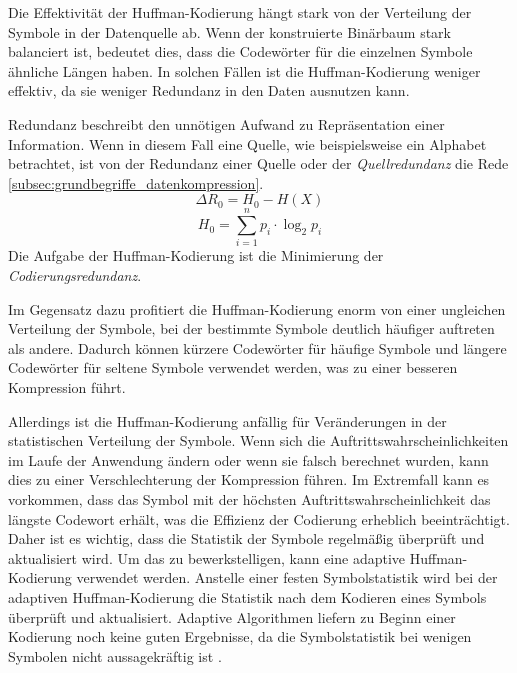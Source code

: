 Die Effektivität der Huffman-Kodierung hängt stark von der Verteilung der Symbole in der Datenquelle ab. 
Wenn der konstruierte Binärbaum stark balanciert ist, bedeutet dies, dass die Codewörter für die einzelnen Symbole ähnliche Längen haben.
In solchen Fällen ist die Huffman-Kodierung weniger effektiv, da sie weniger Redundanz in den Daten ausnutzen kann.

Redundanz beschreibt den unnötigen Aufwand zu Repräsentation einer Information.
Wenn in diesem Fall eine Quelle, wie beispielsweise ein Alphabet betrachtet, ist von der Redundanz einer Quelle oder der \textit{Quellredundanz} die Rede \ref{subsec:grundbegriffe_datenkompression}.
\begin{equation*}
\Delta R_0 = H_0 - H(X)
\end{equation*}
\begin{equation*}
H_0 = \sum_{i=1}^{n} p_i \cdot \log_2{p_i}
\end{equation*}
Die Aufgabe der Huffman-Kodierung ist die Minimierung der \textit{Codierungsredundanz}.

Im Gegensatz dazu profitiert die Huffman-Kodierung enorm von einer ungleichen Verteilung der Symbole, bei der bestimmte Symbole deutlich häufiger auftreten als andere. 
Dadurch können kürzere Codewörter für häufige Symbole und längere Codewörter für seltene Symbole verwendet werden, was zu einer besseren Kompression führt.

Allerdings ist die Huffman-Kodierung anfällig für Veränderungen in der statistischen Verteilung der Symbole. 
Wenn sich die Auftrittswahrscheinlichkeiten im Laufe der Anwendung ändern oder wenn sie falsch berechnet wurden, kann dies zu einer Verschlechterung der Kompression führen. 
Im Extremfall kann es vorkommen, dass das Symbol mit der höchsten Auftrittswahrscheinlichkeit das längste Codewort erhält, was die Effizienz der Codierung erheblich beeinträchtigt. 
Daher ist es wichtig, dass die Statistik der Symbole regelmäßig überprüft und aktualisiert wird.
Um das zu bewerkstelligen, kann eine adaptive Huffman-Kodierung verwendet werden. 
Anstelle einer festen Symbolstatistik wird bei der adaptiven Huffman-Kodierung die Statistik nach dem Kodieren eines Symbols überprüft und aktualisiert. 
Adaptive Algorithmen liefern zu Beginn einer Kodierung noch keine guten Ergebnisse, da die Symbolstatistik bei wenigen Symbolen nicht aussagekräftig ist \cite{Jeon1998}.

